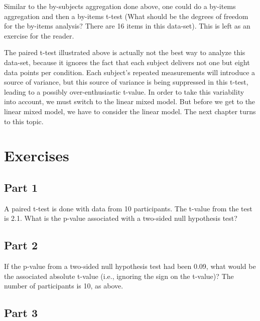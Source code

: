 \documentclass[12pt,]{krantz}
\begin{document}
Similar to the by-subjects aggregation done above, one could do a by-items aggregation and then a by-items t-test (What should be the degrees of freedom for the by-items analysis? There are 16 items in this data-set). This is left as an exercise for the reader.

The paired t-test illustrated above is actually not the best way to analyze this data-set, because it ignores the fact that each subject delivers not one but eight data points per condition. Each subject's repeated measurements will introduce a source of variance, but this source of variance is being suppressed in this t-test, leading to a possibly over-enthusiastic t-value. In order to take this variability into account, we must switch to the linear mixed model. But before we get to the linear mixed model, we have to consider the linear model. The next chapter turns to this topic.

\hypertarget{sec:SamplingDistrnexercises}{%
\section{Exercises}\label{sec:SamplingDistrnexercises}}

\hypertarget{sec:SamplingDistrnexercisesPart1}{%
\subsection{Part 1}\label{sec:SamplingDistrnexercisesPart1}}

A paired t-test is done with data from 10 participants. The t-value from the test is 2.1. What is the p-value associated with a two-sided null hypothesis test?

\hypertarget{sec:SamplingDistrnexercisesPart2}{%
\subsection{Part 2}\label{sec:SamplingDistrnexercisesPart2}}

If the p-value from a two-sided null hypothesis test had been 0.09, what would be the associated absolute t-value (i.e., ignoring the sign on the t-value)? The number of participants is 10, as above.

\hypertarget{sec:SamplingDistrnexercisesPart3}{%
\subsection{Part 3}\label{sec:SamplingDistrnexercisesPart3}}
\end{document}
